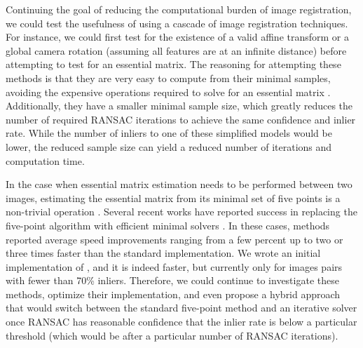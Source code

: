 Continuing the goal of reducing the computational burden of image registration, we could test the usefulness of using a cascade of image registration techniques.
For instance, we could first test for the existence of a valid affine transform or a global camera rotation (assuming all features are at an infinite distance) before attempting to test for an essential matrix.
The reasoning for attempting these methods is that they are very easy to compute from their minimal samples, avoiding the expensive operations required to solve for an essential matrix \cite{nister2003_five_point}.
Additionally, they have a smaller minimal sample size, which greatly reduces the number of required RANSAC iterations to achieve the same confidence and inlier rate.
While the number of inliers to one of these simplified models would be lower, the reduced sample size can yield a reduced number of iterations and computation time.

In the case when essential matrix estimation needs to be performed between two images, estimating the essential matrix from its minimal set of five points is a non-trivial operation \cite{nister2003_five_point}.
Several recent works have reported success in replacing the five-point algorithm with efficient minimal solvers \cite{helmke2007_essential_gauss_newton, rosten2010_ransac_iterative_solvers, botterill2011_fast_ransac_essential, lui2013_iterative_five_point}.
In these cases, methods reported average speed improvements ranging from a few percent up to two or three times faster than the standard implementation.
We wrote an initial implementation of \cite{lui2013_iterative_five_point}, and it is indeed faster, but currently only for images pairs with fewer than 70\% inliers.
Therefore, we could continue to investigate these methods, optimize their implementation, and even propose a hybrid approach that would switch between the standard five-point method and an iterative solver once RANSAC has reasonable confidence that the inlier rate is below a particular threshold (which would be after a particular number of RANSAC iterations).

